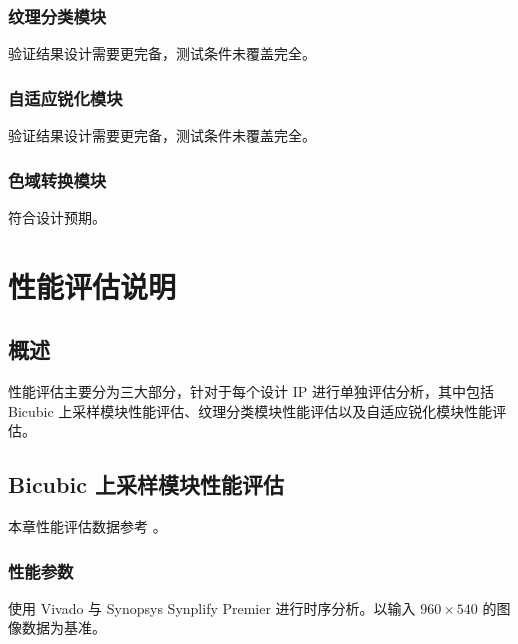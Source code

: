 \documentclass[12pt, a4paper, oneside]{ctexbook}
\begin{document}
	\subsection{纹理分类模块}
	验证结果设计需要更完备，测试条件未覆盖完全。
	\subsection{自适应锐化模块}
	验证结果设计需要更完备，测试条件未覆盖完全。
	\subsection{色域转换模块}
	符合设计预期。
	
	\chapter{性能评估说明}
	\section{概述}
	性能评估主要分为三大部分，针对于每个设计 IP 进行单独评估分析，其中包括 Bicubic 上采样模块性能评估、纹理分类模块性能评估以及自适应锐化模块性能评估。
	
	\section{Bicubic 上采样模块性能评估}
	本章性能评估数据参考 \textbf{}。
	\subsection{性能参数}
	使用 Vivado 与 Synopsys Synplify Premier 进行时序分析。以输入 $960\times540$ 的图像数据为基准。
\end{document}
